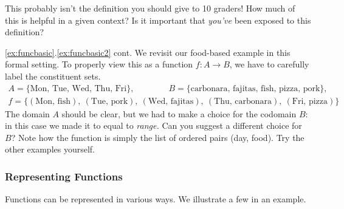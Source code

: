 This probably isn't the definition you should give to 10\th{} graders! How much of this is helpful in a given context? Is it important that \emph{you've} been exposed to this definition?


\begin{example*}{\ref*{ex:funcbasic}.\ref{ex:funcbasic2} cont.}{}
	We revisit our food-based example in this formal setting. To properly view this as a function $f:A\to B$, we have to carefully label the constituent sets.
	\begin{gather*}
		A=\big\{\text{Mon, Tue, Wed, Thu, Fri}\big\},\qquad\qquad
		B=\big\{\text{carbonara, fajitas, fish, pizza, pork}\big\},\\[5pt]
		f=\big\{(\text{Mon,\ fish}),\ (\text{Tue,\ pork}),\ (\text{Wed,\ fajitas}), \ (\text{Thu,\ carbonara}), \ (\text{Fri,\ pizza})\big\}
	\end{gather*}
	The domain $A$ should be clear, but we had to make a choice for the codomain $B$: in this case we made it to equal to \emph{range.} Can you suggest a different choice for $B$? Note how the function is simply the list of ordered pairs (day, food). Try the other examples yourself.
\end{example*}


\subsubsection*{Representing Functions}

Functions can be represented in various ways. We illustrate a few in an example.

